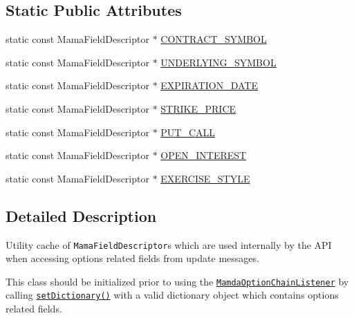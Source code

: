 \subsection*{Static Public Attributes}
\begin{CompactItemize}
\item 
static const Mama\-Field\-Descriptor $\ast$ \hyperlink{classWombat_1_1MamdaOptionFields_8d69ee7f7bd0301816d0c27c58b897ed}{CONTRACT\_\-SYMBOL}
\item 
static const Mama\-Field\-Descriptor $\ast$ \hyperlink{classWombat_1_1MamdaOptionFields_ea8d3e93841f6c2bee999fb1bdbb64b4}{UNDERLYING\_\-SYMBOL}
\item 
static const Mama\-Field\-Descriptor $\ast$ \hyperlink{classWombat_1_1MamdaOptionFields_7417557c75723fda93fefbd7b6b14f2d}{EXPIRATION\_\-DATE}
\item 
static const Mama\-Field\-Descriptor $\ast$ \hyperlink{classWombat_1_1MamdaOptionFields_2d99f732c38e2c8ebb941dd87f49e915}{STRIKE\_\-PRICE}
\item 
static const Mama\-Field\-Descriptor $\ast$ \hyperlink{classWombat_1_1MamdaOptionFields_b0cd0f704c37095d22fc17c0181e83d6}{PUT\_\-CALL}
\item 
static const Mama\-Field\-Descriptor $\ast$ \hyperlink{classWombat_1_1MamdaOptionFields_99e79539b2ab6905bbc9b2e2b85a64b0}{OPEN\_\-INTEREST}
\item 
static const Mama\-Field\-Descriptor $\ast$ \hyperlink{classWombat_1_1MamdaOptionFields_44b34a5e5461c4c1766ddaf82d164c79}{EXERCISE\_\-STYLE}
\end{CompactItemize}


\subsection{Detailed Description}
Utility cache of {\tt Mama\-Field\-Descriptor}s which are used internally by the API when accessing options related fields from update messages. 

This class should be initialized prior to using the {\tt \hyperlink{classWombat_1_1MamdaOptionChainListener}{Mamda\-Option\-Chain\-Listener}} by calling {\tt \hyperlink{classWombat_1_1MamdaOptionFields_4b8a39f6b591cf20fd8b61f059fc5cb6}{set\-Dictionary()}} with a valid dictionary object which contains options related fields. 



